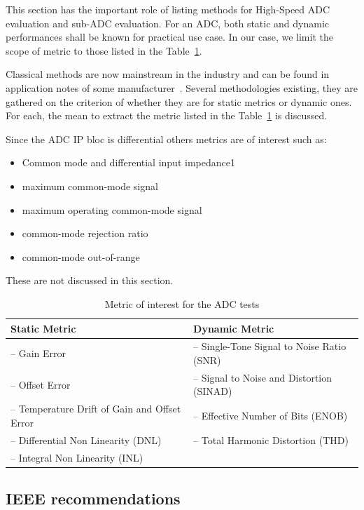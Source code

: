 This section has the important role of listing methods for High-Speed ADC evaluation and sub-ADC evaluation. For an ADC, both static and dynamic performances shall be known for practical use case. In our case, we limit the scope of metric to those listed in the Table~\ref{tbl:adc-metric-subset}.

Classical methods are now mainstream in the industry and can be found in application notes of some manufacturer~\cite{AD-AN835,TI-SBAA002A,AD-DCH2005}. Several methodologies existing, they are gathered on the criterion of whether they are for static metrics or dynamic ones. For each, the mean to extract the metric listed in the Table~\ref{tbl:adc-metric-subset} is discussed.

Since the ADC IP bloc is differential others metrics are of interest such as:
\begin{itemize}
    \item Common mode and differential input impedance1
    \item maximum common-mode signal
    \item maximum operating common-mode signal
    \item common-mode rejection ratio
    \item common-mode out-of-range
\end{itemize}
These are not discussed in this section.

\begin{table}[htp]
    \centering
    \caption{Metric of interest for the ADC tests}
    \label{tbl:adc-metric-subset}
    \begin{tabular}{l|l}
        \toprule
        \textbf{Static Metric} & \textbf{Dynamic Metric} \\ \midrule
        -- Gain Error & -- Single-Tone Signal to Noise Ratio (SNR)\\
        -- Offset Error & -- Signal to Noise and Distortion (SINAD)\\
        -- Temperature Drift of Gain and Offset Error & -- Effective Number of Bits (ENOB)\\
        -- Differential Non Linearity (DNL) & -- Total Harmonic Distortion (THD) \\
        -- Integral Non Linearity (INL) & \\ \bottomrule
    \end{tabular}
\end{table}

\subsection{IEEE recommendations}
